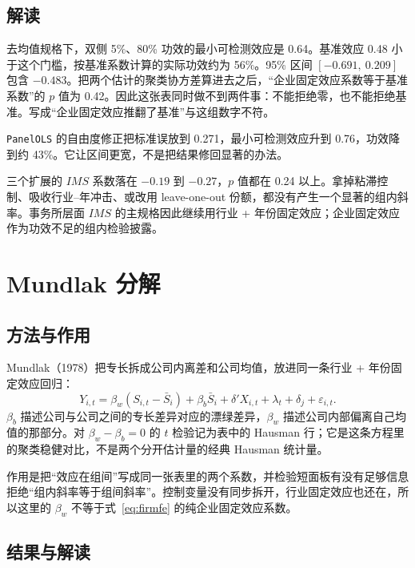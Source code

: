 \documentclass[11pt]{article}
\begin{document}
\subsection{解读}

去均值规格下，双侧 5\%、80\% 功效的最小可检测效应是 0.64。基准效应 0.48 小于这个门槛，按基准系数计算的实际功效约为 56\%。95\% 区间 \([-0.691,\ 0.209]\) 包含 \(-0.483\)。把两个估计的聚类协方差算进去之后，``企业固定效应系数等于基准系数''的 \(p\) 值为 0.42。因此这张表同时做不到两件事：不能拒绝零，也不能拒绝基准。写成``企业固定效应推翻了基准''与这组数字不符。

\texttt{PanelOLS} 的自由度修正把标准误放到 0.271，最小可检测效应升到 0.76，功效降到约 43\%。它让区间更宽，不是把结果修回显著的办法。

三个扩展的 \(IMS\) 系数落在 \(-0.19\) 到 \(-0.27\)，\(p\) 值都在 0.24 以上。拿掉粘滞控制、吸收行业--年冲击、或改用 leave-one-out 份额，都没有产生一个显著的组内斜率。事务所层面 \(IMS\) 的主规格因此继续用行业 + 年份固定效应；企业固定效应作为功效不足的组内检验披露。

\section{Mundlak 分解}
\label{sec:mundlak}

\subsection{方法与作用}

Mundlak（1978）把专长拆成公司内离差和公司均值，放进同一条行业 + 年份固定效应回归：
\begin{equation}
Y_{i,t}=\beta_w(S_{i,t}-\bar S_i)+\beta_b\bar S_i+\delta'X_{i,t}+\lambda_t+\delta_j+\varepsilon_{i,t}.
\label{eq:mundlak}
\end{equation}
\(\beta_b\) 描述公司与公司之间的专长差异对应的漂绿差异，\(\beta_w\) 描述公司内部偏离自己均值的那部分。对 \(\beta_w-\beta_b=0\) 的 \(t\) 检验记为表中的 Hausman 行；它是这条方程里的聚类稳健对比，不是两个分开估计量的经典 Hausman 统计量。

作用是把``效应在组间''写成同一张表里的两个系数，并检验短面板有没有足够信息拒绝``组内斜率等于组间斜率''。控制变量没有同步拆开，行业固定效应也还在，所以这里的 \(\beta_w\) 不等于式~\eqref{eq:firmfe} 的纯企业固定效应系数。

\subsection{结果与解读}
\end{document}
